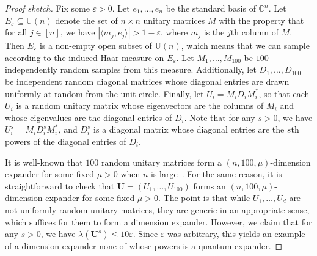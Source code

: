 \documentclass{toc}
\theoremstyle{plain}
\numberwithin{equation}{section}
\theoremstyle{definition}
\newcommand{\bC}{\mathbb{C}}
\newcommand{\ab}[1]{\left\lvert#1\right\rvert}
\newcommand{\tuple}[1]{\mathbf{#1}}
\newcommand{\vU}{\tuple{U}}
\begin{document}
\begin{proof}[Proof sketch]
Fix some $\varepsilon>0$. Let $e_1,\dots,e_n$ be the standard basis of $\bC^n$. Let $E_\varepsilon \subseteq \mathrm U(n)$ denote the set of $n\times n$ unitary matrices $M$ with the property that for all $j\in[n]$, we have $\ab{\langle m_j,e_j\rangle}> 1- \varepsilon$, where $m_j$ is the $j$th column of $M$. Then $E_\varepsilon$ is a non-empty open subset of $\mathrm U(n)$, which means that we can sample according to the induced Haar measure on $E_\varepsilon$. Let $M_1,\dots,M_{100}$ be $100$ independently random samples from this measure. Additionally, let $D_1,\dots,D_{100}$ be independent random diagonal matrices whose diagonal entries are drawn uniformly at random from the unit circle. Finally, let $U_i = M_i D_i M_i^*$, so that each $U_i$ is a random unitary matrix whose eigenvectors are the columns of $M_i$ and whose eigenvalues are the diagonal entries of $D_i$. Note that for any $s>0$, we have $U_i^s = M_i D_i^s M_i^*$, and $D_i^s$ is a diagonal matrix whose diagonal entries are the $s$th powers of the diagonal entries of $D_i$.

It is well-known that $100$ random unitary matrices form a $(n,100,\mu)$-dimension expander for some fixed $\mu>0$ when $n$ is large~\cite{DS09}. For the same reason, it is straightforward to check that $\vU=(U_1,\dots,U_{100})$ forms an $(n,100,\mu)$-dimension expander for some fixed $\mu>0$. The point is that while $U_1,\dots,U_d$ are not uniformly random unitary matrices, they are 
%
generic
%
in an appropriate sense, which suffices for them to form a dimension expander. However, we claim that for any $s>0$, we have $\lambda(\vU^s)\leq 10 \varepsilon$. Since $\varepsilon$ was arbitrary, this yields an example of a dimension expander none of whose powers is a quantum expander. 


\end{proof}
\end{document}
